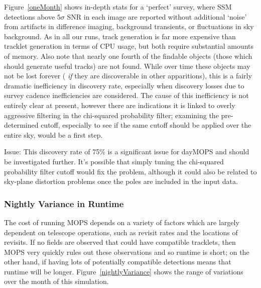 Figure~\ref{oneMonth} shows in-depth stats for a `perfect' survey,
where SSM detections above $5\sigma$ SNR in each image are reported
without additional `noise' from artifacts in difference imaging,
background transients, or fluctuations in sky background.
As in all our runs, track generation is far more expensive than
tracklet generation in terms of CPU usage, but both require
substantial amounts of memory.  Also note that nearly one fourth of
the findable objects (those which should generate useful tracks) are
not found. While over time these objects may not be lost forever ({\it
  if} they are discoverable in other apparitions), this is a fairly dramatic
inefficiency in discovery rate, especially when discovery losses due
to survey cadence inefficiencies are considered. The cause of this
inefficiency is not entirely clear at present, however there are
indications it is linked to overly aggressive filtering in the
chi-squared probability filter; examining the pre-determined cutoff,
especially to see if the same cutoff should be applied over the entire
sky, would be a first step. 

Issue: This discovery rate of 75\% is a significant issue for dayMOPS
and should be investigated further. It's possible that simply tuning
the chi-squared probability filter cutoff would fix the problem,
although it could also be related to sky-plane distortion problems
once the poles are included in the input data. 

\subsubsection{Nightly Variance in Runtime}

The cost of running MOPS depends on a variety of factors which are
largely dependent on telescope operations, such as revisit rates and
the locations of revisits.  If no fields are observed that could have
compatible tracklets, then MOPS very quickly rules out these
observations and so runtime is short; on the other hand, if
having lots of potentially compatible detections means that runtime
will be longer. Figure~\ref{nightlyVariance} shows the range of
variations over the month of this simulation. 


